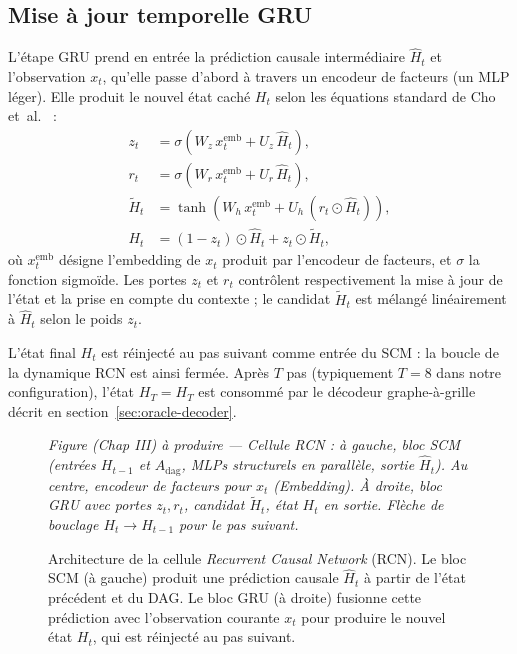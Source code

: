 \documentclass[14pt,a4paper,openany]{extreport}
\theoremstyle{definition}
\newcommand{\Adag}{\ensuremath{A_{\mathrm{dag}}}}
\newcommand{\HT}{\ensuremath{H_T}}
\newcommand{\figplaceholder}[2][0.9\linewidth]{%
  \begin{tcolorbox}[width=#1,height=5cm,valign=center,colback=gray!8,colframe=gray!45,arc=2pt,boxrule=0.5pt]
    \centering\small\textit{#2}
  \end{tcolorbox}%
}
\begin{document}
\subsection{Mise à jour temporelle GRU}
\label{ssec:oracle-rcn-gru}

L'étape GRU prend en entrée la prédiction causale intermédiaire $\hat{H}_t$ et l'observation $x_t$, qu'elle passe d'abord à travers un encodeur de facteurs (un MLP léger). Elle produit le nouvel état caché $H_t$ selon les équations standard de Cho et~al.~\cite{cho_gru_2014} :
\begin{align}
  z_t &= \sigma\!\left( W_z\, x_t^{\mathrm{emb}} + U_z\, \hat{H}_t \right), \label{eq:gru-z}\\
  r_t &= \sigma\!\left( W_r\, x_t^{\mathrm{emb}} + U_r\, \hat{H}_t \right), \label{eq:gru-r}\\
  \tilde{H}_t &= \tanh\!\left( W_h\, x_t^{\mathrm{emb}} + U_h\, (r_t \odot \hat{H}_t) \right), \label{eq:gru-h-tilde}\\
  H_t &= (1 - z_t) \odot \hat{H}_t + z_t \odot \tilde{H}_t, \label{eq:gru-h}
\end{align}
où $x_t^{\mathrm{emb}}$ désigne l'embedding de $x_t$ produit par l'encodeur de facteurs, et $\sigma$ la fonction sigmoïde. Les portes $z_t$ et $r_t$ contrôlent respectivement la mise à jour de l'état et la prise en compte du contexte ; le candidat $\tilde{H}_t$ est mélangé linéairement à $\hat{H}_t$ selon le poids $z_t$.

L'état final $H_t$ est réinjecté au pas suivant comme entrée du SCM : la boucle de la dynamique RCN est ainsi fermée. Après $T$ pas (typiquement $T = 8$ dans notre configuration), l'état $\HT = H_T$ est consommé par le décodeur graphe-à-grille décrit en section~\ref{sec:oracle-decoder}.

\begin{figure}[ht]
  \centering
  \figplaceholder{Figure (Chap III) à produire --- Cellule RCN : à gauche, bloc SCM (entrées $H_{t-1}$ et $\Adag$, MLPs structurels en parallèle, sortie $\hat{H}_t$). Au centre, encodeur de facteurs pour $x_t$ (Embedding). À droite, bloc GRU avec portes $z_t, r_t$, candidat $\tilde{H}_t$, état $H_t$ en sortie. Flèche de bouclage $H_t \to H_{t-1}$ pour le pas suivant.}
  \caption{Architecture de la cellule \emph{Recurrent Causal Network} (RCN). Le bloc SCM (à gauche) produit une prédiction causale $\hat{H}_t$ à partir de l'état précédent et du DAG. Le bloc GRU (à droite) fusionne cette prédiction avec l'observation courante $x_t$ pour produire le nouvel état $H_t$, qui est réinjecté au pas suivant.}
  \label{fig:rcn-cellule}
\end{figure}
\end{document}
